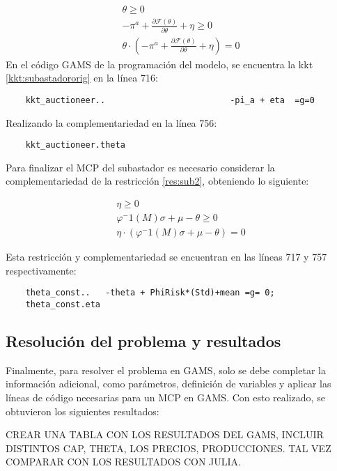 \footnotesize{
\begin{align}
    \theta \geq 0 \\
    -\pi^a + \frac{\partial\mathcal{F}(\theta)}{\partial \theta} + \eta \geq 0\\
    \theta \cdot (-\pi^a + \frac{\partial\mathcal{F}(\theta)}{\partial \theta} + \eta)=0
\end{align}
}
En el código GAMS de la programación del modelo, se encuentra la kkt \ref{kkt:subastadororig} en la línea 716:

\begin{verbatim}
    kkt_auctioneer..                         -pi_a + eta  =g=0
\end{verbatim}

Realizando la complementariedad en la línea 756:

\begin{verbatim}
    kkt_auctioneer.theta
\end{verbatim}

Para finalizar el MCP del subastador es necesario considerar la complementariedad de la restricción \ref{res:sub2}, obteniendo lo siguiente: 

\footnotesize{
\begin{align}
 \eta \geq 0 \\
 \varphi^-1(M)\sigma+\mu-\theta \geq 0 \\
 \eta \cdot (\varphi^-1(M)\sigma+\mu-\theta)=0
\end{align}}

Esta restricción y complementariedad se encuentran en las líneas 717 y 757 respectivamente:

\begin{verbatim}
    theta_const..   -theta + PhiRisk*(Std)+mean =g= 0;
    theta_const.eta
\end{verbatim}

\subsection{Resolución del problema y resultados}

Finalmente, para resolver el problema en GAMS, solo se debe completar la información adicional, como parámetros, definición de variables y aplicar las líneas de código necesarias para un MCP en GAMS. Con esto realizado, se obtuvieron los siguientes resultados:
\vspace{2.5mm}

CREAR UNA TABLA CON LOS RESULTADOS DEL GAMS, INCLUIR DISTINTOS CAP, THETA, LOS PRECIOS, PRODUCCIONES. 
TAL VEZ COMPARAR CON LOS RESULTADOS CON JULIA.


